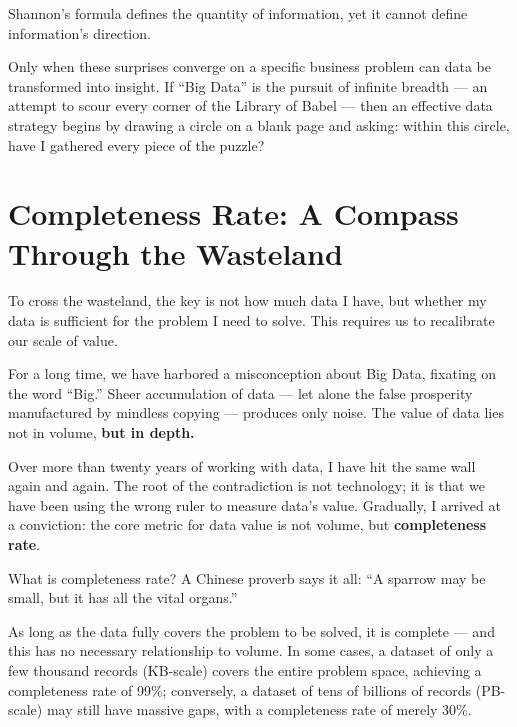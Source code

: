 \vspace{1em}

Shannon's formula defines the quantity of information, yet it cannot define information's direction.

Only when these surprises converge on a specific business problem can data be transformed into insight.
If ``Big Data'' is the pursuit of infinite breadth --- an attempt to scour every corner of the Library of Babel ---
then an effective data strategy begins by drawing a circle on a blank page and asking: within this circle, have I gathered every piece of the puzzle?


\newpage
\section{Completeness Rate: A Compass Through the Wasteland}

To cross the wasteland, the key is not how much data I have, but whether my data is sufficient for the problem I need to solve.
This requires us to recalibrate our scale of value.

For a long time, we have harbored a misconception about Big Data, fixating on the word ``Big.'' Sheer accumulation of data --- let alone the false prosperity manufactured by mindless copying --- produces only noise. The value of data lies not in volume, \textbf{but in depth.}

\vspace{1em}

Over more than twenty years of working with data, I have hit the same wall again and again. The root of the contradiction is not technology; it is that we have been using the wrong ruler to measure data's value. Gradually, I arrived at a conviction: the core metric for data value is not volume, but \textbf{completeness rate}.

\begin{importantbox}
What is completeness rate? A Chinese proverb says it all: ``A sparrow may be small, but it has all the vital organs.''
\end{importantbox}

As long as the data fully covers the problem to be solved, it is complete --- and this has no necessary relationship to volume. In some cases, a dataset of only a few thousand records (KB-scale) covers the entire problem space, achieving a completeness rate of 99\%; conversely, a dataset of tens of billions of records (PB-scale) may still have massive gaps, with a completeness rate of merely 30\%.

